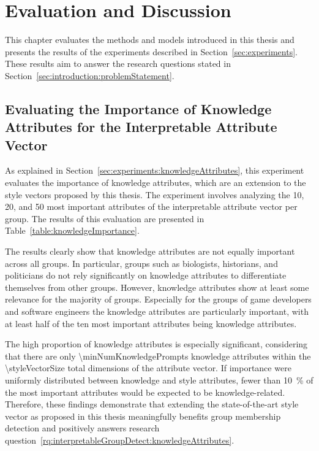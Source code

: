 \chapter{Evaluation and Discussion}%
\label{sec:evaluation}

This chapter evaluates the methods and models introduced in this thesis and presents the results of the experiments described in Section~\ref{sec:experiments}. These results aim to answer the research questions stated in Section~\ref{sec:introduction:problemStatement}.

\section{Evaluating the Importance of Knowledge Attributes for the Interpretable Attribute Vector}%
\label{sec:evaluation:knowledgeAttributes}

As explained in Section~\ref{sec:experiments:knowledgeAttributes}, this experiment evaluates the importance of knowledge attributes, which are an extension to the style vectors proposed by this thesis. The experiment involves analyzing the \num{10}, \num{20}, and \num{50} most important attributes of the interpretable attribute vector per group. The results of this evaluation are presented in Table~\ref{table:knowledgeImportance}.

The results clearly show that knowledge attributes are not equally important across all groups. In particular, groups such as biologists, historians, and politicians do not rely significantly on knowledge attributes to differentiate themselves from other groups. However, knowledge attributes show at least some relevance for the majority of groups. Especially for the groups of game developers and software engineers the knowledge attributes are particularly important, with at least half of the ten most important attributes being knowledge attributes.

The high proportion of knowledge attributes is especially significant, considering that there are only \num{\minNumKnowledgePrompts} knowledge attributes within the \num{\styleVectorSize} total dimensions of the attribute vector. If importance were uniformly distributed between knowledge and style attributes, fewer than \SI{10}{\percent} of the most important attributes would be expected to be knowledge-related. Therefore, these findings demonstrate that extending the state-of-the-art style vector as proposed in this thesis meaningfully benefits group membership detection and positively answers research question~\ref{rq:interpretableGroupDetect:knowledgeAttributes}.

